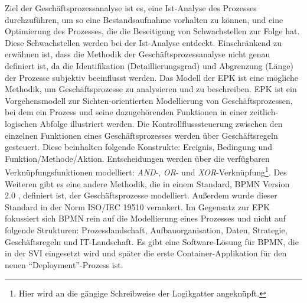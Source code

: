 Ziel der Geschäftsprozessanalyse ist es, eine Ist-Analyse des Prozesses durchzuführen, um so eine Bestandsaufnahme vorhalten zu können, und eine Optimierung des Prozesses, die die Beseitigung von Schwachstellen zur Folge hat. Diese Schwachstellen werden bei der Ist-Analyse entdeckt. Einschränkend zu erwähnen ist, dass die Methodik der Geschäftsprozessanalyse nicht genau definiert ist, da die Identifikation (Detaillierungsgrad) und Abgrenzung (Länge) der Prozesse subjektiv beeinflusst werden. Das Modell der \ac{EPK} ist eine mögliche Methodik, um Geschäftsprozesse zu analysieren und zu beschreiben.\autocite[vgl.][S.\,59]{staud_geschaftsprozessanalyse_2006} \ac{EPK} ist ein Vorgehensmodell zur Sichten-orientierten Modellierung von Geschäftsprozessen, bei dem ein Prozess und seine dazugehörenden Funktionen in einer zeitlich-logischen Abfolge illustriert werden.\autocite[vgl.][S.\,4]{scheer_objektorientierte_1997} Die Kontrollflusssteuerung zwischen den einzelnen Funktionen eines Geschäftsprozesses werden über Geschäftsregeln gesteuert. Diese beinhalten folgende Konstrukte: Ereignis, Bedingung und Funktion/Methode/Aktion. Entscheidungen werden über die verfügbaren Verknüpfungsfunktionen modelliert:\autocite[vgl.][S.\,4]{scheer_objektorientierte_1997} \textit{AND}-, \textit{OR}- und \textit{XOR}-Verknüpfung\footnote{Hier wird an die gängige Schreibweise der Logikgatter angeknüpft.}. Des Weiteren gibt es eine andere Methodik, die in einem Standard, \ac{BPMN} Version 2.0 \autocite{object_management_group_omg_business_2011}, definiert ist, der Geschäftsprozesse modelliert. Außerdem wurde dieser Standard in der Norm ISO/IEC 19510 verankert.\autocite{ict1_information_2020} Im Gegensatz zur \ac{EPK} fokussiert sich \ac{BPMN} rein auf die Modellierung eines Prozesses und nicht auf folgende Strukturen: Prozesslandschaft, Aufbauorganisation, Daten, Strategie, Geschäftsregeln und IT-Landschaft.\autocite[vgl.][S.\,28]{freund_praxishandbuch_2017} Es gibt eine Software-Lösung für \ac{BPMN}, die in der \ac{SVI} eingesetzt wird und später die erste Container-Applikation für den neuen \enquote{Deployment}-Prozess ist.

